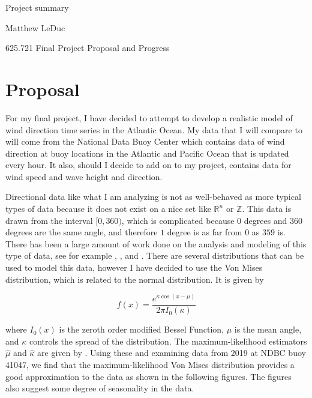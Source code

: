 \documentclass[11pt]{article}
\begin{document}
\setlength\parindent{24pt}

\begin{center}
Project summary

\null

Matthew LeDuc

\null

625.721 Final Project Proposal and Progress
\end{center}

\section{Proposal}
For my final project, I have decided to attempt to develop a realistic model of wind direction time series in the Atlantic Ocean. My data that I will compare to will come from the National Data Buoy Center which contains data of wind direction at buoy locations in the Atlantic and Pacific Ocean that is updated every hour. 
It also, should I decide to add on to my project, contains data for wind speed and wave height and direction. 

Directional data like what I am analyzing is not as well-behaved as more typical types of data because it does not exist on a nice set like $\mathbb{R}^n$ or $\mathbb{Z}$. This data is drawn from the interval $[0,360)$, which is complicated because $0$ degrees and $360$ degrees are the same angle, and therefore $1$ degree is as far from $0$ as $359$ is. There has been a large amount of work done on the analysis and modeling of this type of data, see for example \cite{fisher}, \cite{Craig}, and \cite{Kaito}. There are several distributions that can be used to model this data, however I have decided to use the Von Mises distribution, which is related to the normal distribution. It is given by 

\begin{equation}
f(x) = \frac{e^{\kappa \cos{(x-\mu)}}}{2\pi I_0(\kappa)}
\end{equation}

where $I_0(x)$ is the zeroth order modified Bessel Function, $\mu$ is the mean angle, and $\kappa$ controls the spread of the distribution. The maximum-likelihood estimators $\hat{\mu}$ and $\hat{\kappa}$ are given by \cite{borradaile}. Using these and examining data from 2019 at NDBC buoy 41047, we find that the maximum-likelihood Von Mises distribution provides a good approximation to the data as shown in the following figures. The figures also suggest some degree of seasonality in the data.
\end{document}
